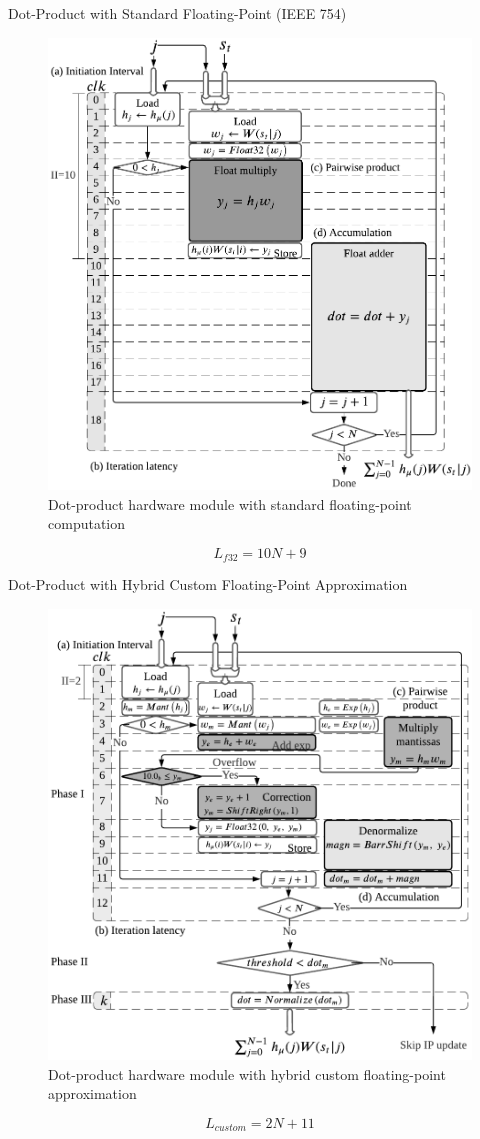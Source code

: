 \begin{frame}{Dot-Product with Standard Floating-Point (IEEE 754)}
	\begin{figure}
		\centering
		\includegraphics[width=0.4\columnwidth]{../chapters/sbs_accelerator/figures/dot_product_float.pdf}
		\caption{Dot-product hardware module with standard floating-point computation}
	\end{figure}
	
	\vfill %
	
	\[
	 L_{f32}=10N+9
	\]
\end{frame}

\begin{frame}{Dot-Product with Hybrid Custom Floating-Point Approximation}
	\begin{figure}
		\centering
		\includegraphics[width=0.4\columnwidth]{../chapters/sbs_accelerator/figures/dot_product.pdf}
		\caption{Dot-product hardware module with hybrid custom floating-point approximation}
	\end{figure}
	
	\vfill %
	
	\[
	L_{custom}=2N+11
	\]
\end{frame}

